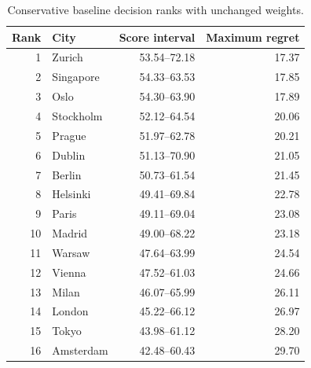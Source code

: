 \begin{table}[!ht]\centering
\caption{Conservative baseline decision ranks with unchanged weights.}\label{tab:baseline}
\begin{tabular}{rlrr}\toprule
Rank & City & Score interval & Maximum regret\\\midrule
1 & Zurich & 53.54--72.18 & 17.37 \\
2 & Singapore & 54.33--63.53 & 17.85 \\
3 & Oslo & 54.30--63.90 & 17.89 \\
4 & Stockholm & 52.12--64.54 & 20.06 \\
5 & Prague & 51.97--62.78 & 20.21 \\
6 & Dublin & 51.13--70.90 & 21.05 \\
7 & Berlin & 50.73--61.54 & 21.45 \\
8 & Helsinki & 49.41--69.84 & 22.78 \\
9 & Paris & 49.11--69.04 & 23.08 \\
10 & Madrid & 49.00--68.22 & 23.18 \\
11 & Warsaw & 47.64--63.99 & 24.54 \\
12 & Vienna & 47.52--61.03 & 24.66 \\
13 & Milan & 46.07--65.99 & 26.11 \\
14 & London & 45.22--66.12 & 26.97 \\
15 & Tokyo & 43.98--61.12 & 28.20 \\
16 & Amsterdam & 42.48--60.43 & 29.70 \\
\bottomrule\end{tabular}\end{table}
